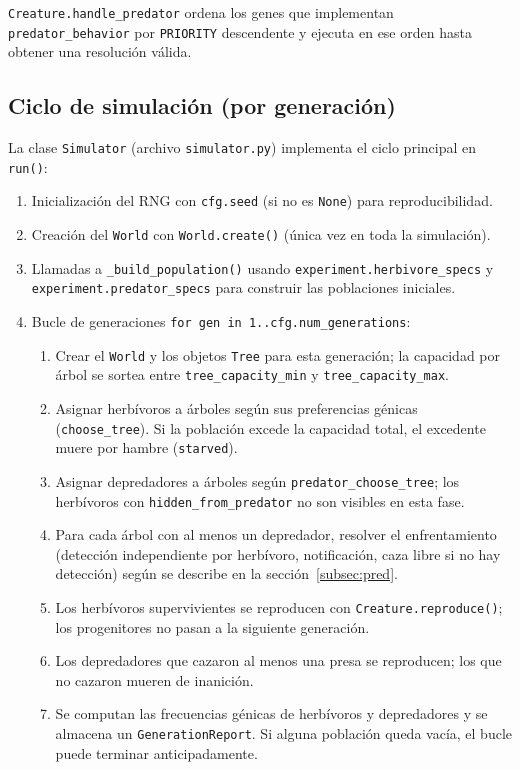\documentclass[11pt,a4paper]{article}
\begin{document}
\texttt{Creature.handle\_predator} ordena los genes que implementan \texttt{predator\_behavior} por \texttt{PRIORITY}
descendente y ejecuta en ese orden hasta obtener una resoluci\'on v\'alida.

\subsection{Ciclo de simulaci\'on (por generaci\'on)}

La clase \texttt{Simulator} (archivo \texttt{simulator.py}) implementa el ciclo principal en \texttt{run()}:
\begin{enumerate}
	\item Inicializaci\'on del RNG con \texttt{cfg.seed} (si no es \texttt{None}) para reproducibilidad.
	\item Creaci\'on del \texttt{World} con \texttt{World.create()} (\'unica vez en toda la simulaci\'on).
	\item Llamadas a \texttt{\_build\_population()} usando \texttt{experiment.herbivore\_specs} y
	\texttt{experiment.predator\_specs} para construir las poblaciones iniciales.
	\item Bucle de generaciones \texttt{for gen in 1..cfg.num\_generations}:
		\begin{enumerate}
			\item Crear el \texttt{World} y los objetos \texttt{Tree} para esta generaci\'on;
			la capacidad por \'arbol se sortea entre \texttt{tree\_ca\-pa\-ci\-ty\_min}
			y \texttt{tree\_ca\-pa\-ci\-ty\_max}.
			\item Asignar herb\'ivoros a \'arboles seg\'un sus preferencias g\'enicas
			(\texttt{choose\_tree}). Si la poblaci\'on excede la capacidad total, el excedente muere
			por hambre (\texttt{starved}).
			\item Asignar depredadores a \'arboles seg\'un \texttt{predator\_choose\_tree}; los
			herb\'ivoros con \texttt{hidden\_from\_predator} no son visibles en esta fase.
			\item Para cada \'arbol con al menos un depredador, resolver el enfrentamiento
			(detecci\'on independiente por herb\'ivoro, notificaci\'on, caza libre si no hay
			detecci\'on) seg\'un se describe en la secci\'on~\ref{subsec:pred}.
			\item Los herb\'ivoros supervivientes se reproducen con \texttt{Creature.reproduce()};
			los progenitores no pasan a la siguiente generaci\'on.
			\item Los depredadores que cazaron al menos una presa se reproducen; los que no cazaron
			mueren de inanici\'on.
			\item Se computan las frecuencias g\'enicas de herb\'ivoros y depredadores y se almacena
			un \texttt{GenerationReport}. Si alguna poblaci\'on queda vac\'ia, el bucle puede
			terminar anticipadamente.
		\end{enumerate}
\end{enumerate}
\end{document}
